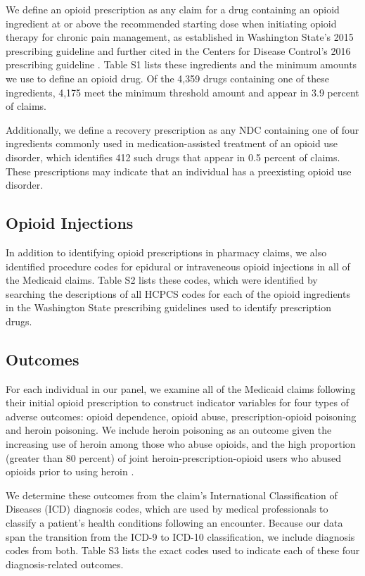 \documentclass[9pt,twoside,lineno]{pnas-new}
\begin{document}
We define an opioid prescription as any claim for a drug containing an opioid ingredient at or above the recommended starting dose when initiating opioid therapy for chronic pain management, as established in Washington State's 2015 prescribing guideline and further cited in the Centers for Disease Control's 2016 prescribing guideline \cite{amdg, dowell}. Table S1 lists these ingredients and the minimum amounts we use to define an opioid drug. Of the 4,359 drugs containing one of these ingredients, 4,175 meet the minimum threshold amount and appear in 3.9 percent of claims.

Additionally, we define a recovery prescription as any NDC containing one of four ingredients commonly used in medication-assisted treatment of an opioid use disorder, which identifies 412 such drugs that appear in 0.5 percent of claims. These prescriptions may indicate that an individual has a preexisting opioid use disorder.

\subsection{Opioid Injections}

In addition to identifying opioid prescriptions in pharmacy claims, we also identified procedure codes for epidural or intraveneous opioid injections in all of the Medicaid claims. Table S2 lists these codes, which were identified by searching the descriptions of all HCPCS codes for each of the opioid ingredients in the Washington State prescribing guidelines used to identify prescription drugs.

\subsection{Outcomes}

For each individual in our panel, we examine all of the Medicaid claims following their initial opioid prescription to construct indicator variables for four types of adverse outcomes: opioid dependence, opioid abuse, prescription-opioid poisoning and heroin poisoning. We include heroin poisoning as an outcome given the increasing use of heroin among those who abuse opioids, and the high proportion (greater than 80 percent) of joint heroin-prescription-opioid users who abused opioids prior to using heroin \cite{jones}.

We determine these outcomes from the claim's International Classification of Diseases (ICD) diagnosis codes, which are used by medical professionals to classify a patient's health conditions following an encounter. Because our data span the transition from the ICD-9 to ICD-10 classification, we include diagnosis codes from both. Table S3 lists the exact codes used to indicate each of these four diagnosis-related outcomes. 
\end{document}
